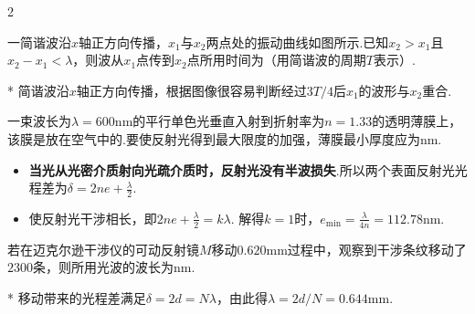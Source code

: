 \begin{paracol}{2}
    \begin{problem}[平面简谐波的物理量][3]
    一简谐波沿$x$轴正方向传播，$x_1$与$x_2$两点处的振动曲线如图所示.已知$x_2>x_1$且$x_2-x_1<\lambda$，则波从$x_1$点传到$x_2$点所用时间为（用简谐波的周期$T$表示）.
    \end{problem}
    \switchcolumn\centering
    \vfill
    \vfill
\end{paracol}
\begin{solution}*
    简谐波沿$x$轴正方向传播，根据图像很容易判断经过$3T/4$后$x_1$的波形与$x_2$重合.
\end{solution}

\begin{problem}[增透膜][3]
    一束波长为$\lambda=600\mathrm{nm}$的平行单色光垂直入射到折射率为$n=1.33$的透明薄膜上，该膜是放在空气中的.要使反射光得到最大限度的加强，薄膜最小厚度应为$\mathrm{nm}$.
\end{problem}
\begin{solution}
\begin{itemize}
    \item \textbf{当光从光密介质射向光疏介质时，反射光没有半波损失}.所以两个表面反射光光程差为$\delta=2ne+\frac\lambda2$.
    \item 使反射光干涉相长，即$2ne+\frac\lambda2=k\lambda$. 解得$k=1$时，$e_{\min}=\frac{\lambda}{4n}=112.78\mathrm{nm}$.
\end{itemize}
\end{solution}

\begin{problem}[迈克尔逊干涉仪][3]
    若在迈克尔逊干涉仪的可动反射镜$M$移动$0.620\mathrm{mm}$过程中，观察到干涉条纹移动了$2300$条，则所用光波的波长为$\mathrm{nm}$.
\end{problem}
\begin{solution}*
    移动带来的光程差满足$\delta=2d=N\lambda$，由此得$\lambda=2d/N=0.644\mathrm{mm}$.
\end{solution}

